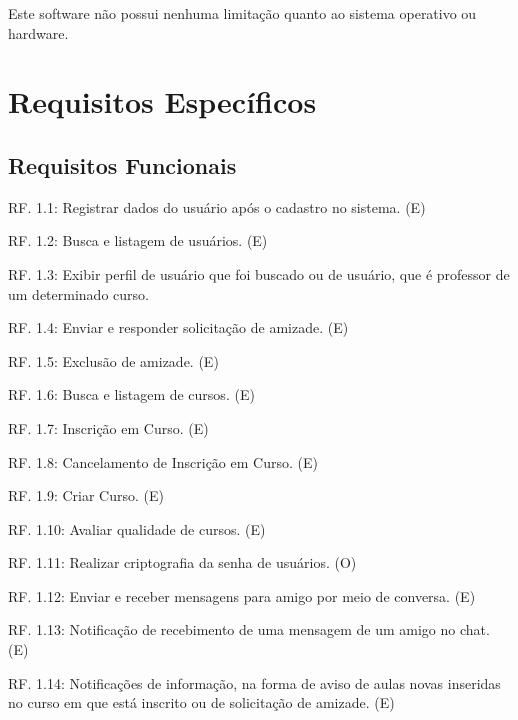 \documentclass[12pt,a4paper,onecolumn,titlepage]{article}
\begin{document}
Este software não possui nenhuma limitação quanto ao sistema operativo ou hardware.

\section{Requisitos Específicos}
\label{sect:requisitos}



\subsection{Requisitos Funcionais}



RF. 1.1: Registrar dados do usuário após o cadastro no sistema. (E)

RF. 1.2: Busca e listagem de usuários. (E)

RF. 1.3: Exibir perfil de usuário que foi buscado ou de usuário, que é professor de um determinado curso.

RF. 1.4: Enviar e responder solicitação de amizade. (E)

RF. 1.5: Exclusão de amizade. (E)

RF. 1.6: Busca e listagem de cursos. (E)

RF. 1.7: Inscrição em Curso. (E)

RF. 1.8: Cancelamento de Inscrição em Curso. (E)

RF. 1.9: Criar Curso. (E)

RF. 1.10: Avaliar qualidade de cursos. (E)

RF. 1.11: Realizar criptografia da senha de usuários. (O)

RF. 1.12: Enviar e receber mensagens para amigo por meio de conversa. (E)

RF. 1.13: Notificação de recebimento de uma mensagem de um amigo no chat. (E)

RF. 1.14: Notificações de informação, na forma de aviso de aulas novas inseridas no curso em que está inscrito ou de solicitação de amizade. (E)
\end{document}
